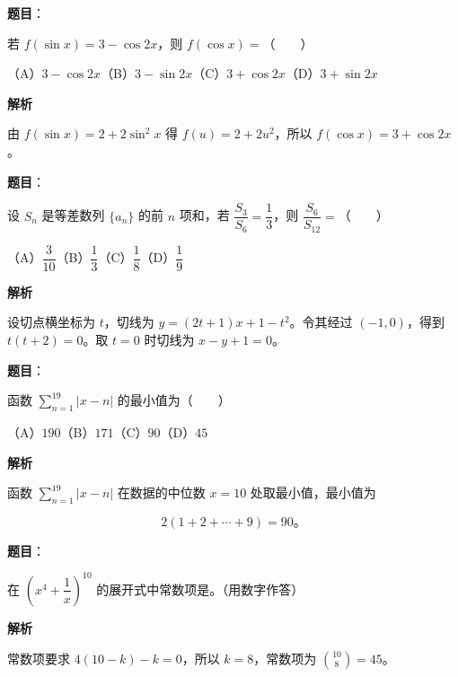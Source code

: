 \begin{answer}

\textbf{题目}：

若 $f(\sin x)=3-\cos2x$，则 $f(\cos x)=$\mbox{（　　）}

（A）$3-\cos2x$\quad（B）$3-\sin2x$\quad（C）$3+\cos2x$\quad（D）$3+\sin2x$

\textbf{解析}

由 $f(\sin x)=2+2\sin^2x$ 得 $f(u)=2+2u^2$，所以 $f(\cos x)=3+\cos2x$。


\end{answer}
\begin{answer}

\textbf{题目}：

设 $S_n$ 是等差数列 $\{a_n\}$ 的前 $n$ 项和，若 $\dfrac{S_3}{S_6}=\dfrac13$，则 $\dfrac{S_6}{S_{12}}=$\mbox{（　　）}

（A）$\dfrac3{10}$\quad（B）$\dfrac13$\quad（C）$\dfrac18$\quad（D）$\dfrac19$

\textbf{解析}

设切点横坐标为 $t$，切线为 $y=(2t+1)x+1-t^2$。令其经过 $(-1,0)$，得到 $t(t+2)=0$。取 $t=0$ 时切线为 $x-y+1=0$。


\end{answer}
\begin{answer}

\textbf{题目}：

函数 $\displaystyle\sum_{n=1}^{19}|x-n|$ 的最小值为\mbox{（　　）}

（A）$190$\quad（B）$171$\quad（C）$90$\quad（D）$45$

\textbf{解析}

函数 $\sum_{n=1}^{19}|x-n|$ 在数据的中位数 $x=10$ 处取最小值，最小值为

\nopagebreak[4]
\[
2(1+2+\cdots+9)=90\text{。}
\]


\end{answer}
\begin{answer}

\textbf{题目}：

在 $\left(x^4+\dfrac1x\right)^{10}$ 的展开式中常数项是\gkblank{}。（用数字作答）

\textbf{解析}

常数项要求 $4(10-k)-k=0$，所以 $k=8$，常数项为 $\binom{10}{8}=45$。


\end{answer}
